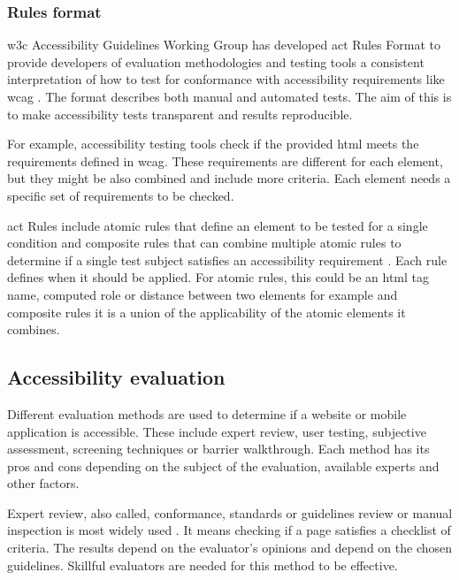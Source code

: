 \documentclass{master_thesis}
\begin{document}
\subsubsection{Rules format}

\ac{w3c} Accessibility Guidelines Working Group has developed \ac{act} Rules Format to provide developers of evaluation methodologies and testing tools a consistent interpretation of how to test for conformance with accessibility requirements like \ac{wcag} \citep{Fiers2019}. The format describes both manual and automated tests. The aim of this is to make accessibility tests transparent and results reproducible.

For example, accessibility testing tools check if the provided \ac{html} meets the requirements defined in \ac{wcag}. These requirements are different for each element, but they might be also combined and include more criteria. Each element needs a specific set of requirements to be checked.

\ac{act} Rules include atomic rules that define an element to be tested for a single condition and composite rules that can combine multiple atomic rules to determine if a single test subject satisfies an accessibility requirement \citep{Fiers2019}. Each rule defines when it should be applied. For atomic rules, this could be an \ac{html} tag name, computed role or distance between two elements for example and composite rules it is a union of the applicability of the atomic elements it combines.

\subsection{Accessibility evaluation}


Different evaluation methods are used to determine if a website or mobile application is accessible. These include expert review, user testing, subjective assessment, screening techniques or barrier walkthrough. Each method has its pros and cons depending on the subject of the evaluation, available experts and other factors.

Expert review, also called, conformance, standards or guidelines review or manual inspection is most widely used \citep{Brajnik2008}. It means checking if a page satisfies a checklist of criteria. The results depend on the evaluator's opinions and depend on the chosen guidelines. Skillful evaluators are needed for this method to be effective.
\end{document}
